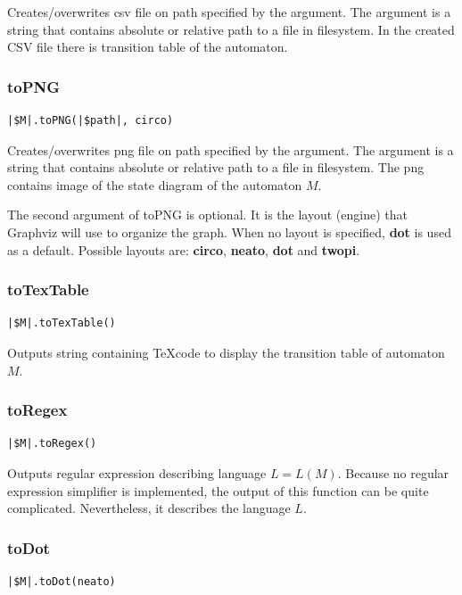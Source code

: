 \documentclass{ctuthesis}
\begin{document}
Creates/overwrites csv file on path specified by the argument. The argument is a string that contains absolute or relative path to a file in filesystem. In the created CSV file there is transition table of the automaton.

\subsubsection{toPNG}
\begin{lstlisting}[language = JASL_snippet]
	|$M|.toPNG(|$path|, circo)
\end{lstlisting}

Creates/overwrites png file on path specified by the argument. The argument is a string that contains absolute or relative path to a file in filesystem. The png contains image of the state diagram of the automaton $M$. 

The second argument of toPNG is optional. It is the layout (engine) that Graphviz will use to organize the graph. When no layout is specified, \textbf{dot} is used as a default. Possible layouts are: \textbf{circo}, \textbf{neato}, \textbf{dot} and \textbf{twopi}.

\subsubsection{toTexTable}
\begin{lstlisting}[language = JASL_snippet]
	|$M|.toTexTable()
\end{lstlisting}

Outputs string containing \TeX code to display the transition table of automaton $M$. 

\subsubsection{toRegex}
\begin{lstlisting}[language = JASL_snippet]
	|$M|.toRegex()
\end{lstlisting}

Outputs regular expression describing language $L = L(M)$. Because no regular expression simplifier is implemented, the output of this function can be quite complicated. Nevertheless, it describes the language $L$. 

\subsubsection{toDot}
\label{subsec:toDot}
\begin{lstlisting}[language = JASL_snippet]
	|$M|.toDot(neato)
\end{lstlisting}
\end{document}
